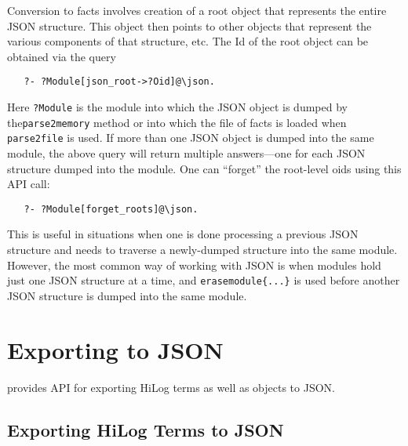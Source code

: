 Conversion to facts involves creation of a root \ERGO object that represents
the entire JSON structure. This object then points to
other objects that represent the various components of that structure, etc.
The Id of the root object can be obtained via the query
\begin{verbatim}
   ?- ?Module[json_root->?Oid]@\json.
\end{verbatim}
Here \texttt{?Module}   is the module into which the JSON object is
dumped by the\texttt{parse2memory} method or into which the file of facts is loaded 
when \texttt{parse2file} is used.
If more than one JSON object is dumped into the same module, the above query
will return multiple answers---one for each JSON structure dumped into the module.
One can ``forget'' the root-level oids using this API call:
\begin{verbatim}
   ?- ?Module[forget_roots]@\json.
\end{verbatim}
This is useful in situations when one is done processing a previous
JSON structure and needs to traverse a newly-dumped structure into the same
module.
However, the most common way of working with JSON is when modules hold just
one JSON structure at a time,
and \texttt{erasemodule\{...\}} is used before another JSON
structure is dumped into the same module. 


\section{Exporting to JSON}

\ERGO provides API for exporting HiLog terms as well as objects to JSON.

\subsection{Exporting  HiLog Terms to JSON}

